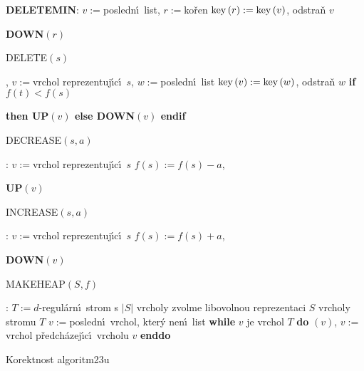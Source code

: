 {\bf DELETEMIN}:\newline 
$v:=$posledn\'\i\ list, $r:=$ko\v ren\newline 
$\operatorname{key}\left(r\right):=\operatorname{key}\left(v\right)$, odstra\v n $v$\newline 
{\bf DOWN$\left(r\right)$
\medskip

DELETE$\left(s\right)$},\newline 
$v:=$vrchol reprezentuj\'\i c\'\i\ $s$, $w:=$posledn\'\i\ list\newline 
$\operatorname{key}\left(v\right):=\operatorname{key}\left(w\right)$, odstra\v n $w$\newline 
{\bf if} $f\left(t\right)<f\left(s\right)$ {\bf then UP$\left(v\right)$ else DOWN$\left(v\right)$ endif
\medskip

DECREASE$\left(s,a\right)$}:\newline 
$v:=$vrchol reprezentuj\'\i c\'\i\ $s$\newline 
$f\left(s\right):=f\left(s\right)-a$, {\bf UP$\left(v\right)$
\medskip

INCREASE$\left(s,a\right)$}:\newline 
$v:=$vrchol reprezentuj\'\i c\'\i\ $s$\newline 
$f\left(s\right):=f\left(s\right)+a$, {\bf DOWN$\left(v\right)$
\medskip

MAKEHEAP$\left(S,f\right)$}:\newline 
$T:=d$-regul\'arn\'\i\ strom s $|S|$ vrcholy\newline 
zvolme libovolnou reprezentaci $S$ vrcholy stromu $T$\newline 
$v:=$posledn\'\i\ vrchol, kter\'y nen\'\i\ list\newline 
{\bf while} $v$ je vrchol $T$ {\bf do}\newline 
\phantom{---}{\bf DOWN}$\left(v\right)$, $v:=$vrchol p\v redch\'azej\'\i c\'\i\ vrcholu $v$\newline 
{\bf enddo}
\medskip

\subhead 
Korektnost algoritm\accent23u
\endsubhead


